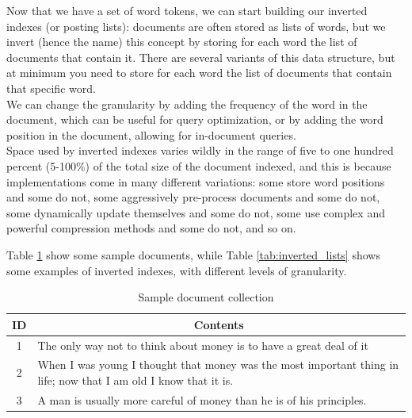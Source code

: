 Now that we have a set of word tokens, we can start building our inverted indexes (or posting lists): documents are often stored as lists of words, but we invert (hence the name) this concept by storing for each word the list of documents that contain it. There are several variants of this data structure, but at minimum you need to store for each word the list of documents that contain that specific word. \\
We can change the granularity by adding the frequency of the word in the document, which can be useful for query optimization, or by adding the word position in the document, allowing for in-document queries.\\
Space used by inverted indexes varies wildly in the range of five to one hundred percent (5-100\%) of the total size of the document indexed, and this is because implementations come in many different variations: some store word positions and some do not, some aggressively pre-process documents and some do not, some dynamically update themselves and some do not, some use complex and powerful compression methods and some do not, and so on. 

Table \ref{tab:sample_docs} show some sample documents, while Table \ref{tab:inverted_lists} shows some examples of inverted indexes, with different levels of granularity.

\begin{table}[ht]
    \begin{center}
        \begin{tabularx}{\textwidth}{|c|X|}
            \hline
            \textbf{ID} & \multicolumn{1}{c|}{\textbf{Contents}}  \\ \hline
            1 & The only way not to think about money is to have a great deal of it \\ \hline
            2 & When I was young I thought that money was the most important thing in life; now that I am old I know that it is. \\ \hline
            3 & A man is usually more careful of money than he is of his principles.\\ \hline
        \end{tabularx}
        \caption{Sample document collection\label{tab:sample_docs}}
    \end{center}
\end{table}

